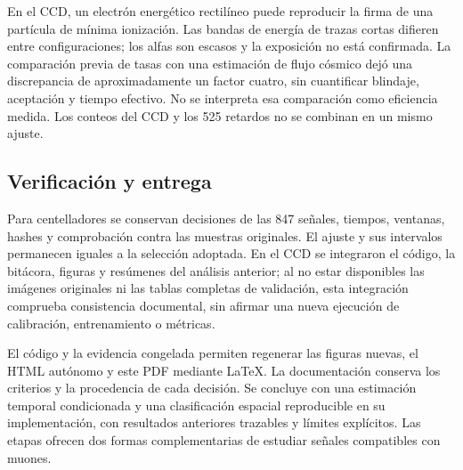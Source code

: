 \documentclass[10pt,a4paper]{article}
\begin{document}
En el CCD, un electrón energético rectilíneo puede reproducir la firma de una partícula de mínima ionización. Las bandas de energía de trazas cortas difieren entre configuraciones; los alfas son escasos y la exposición no está confirmada. La comparación previa de tasas con una estimación de flujo cósmico dejó una discrepancia de aproximadamente un factor cuatro, sin cuantificar blindaje, aceptación y tiempo efectivo. No se interpreta esa comparación como eficiencia medida. Los conteos del CCD y los 525 retardos no se combinan en un mismo ajuste.

\subsection*{Verificación y entrega}
Para centelladores se conservan decisiones de las 847 señales, tiempos, ventanas, hashes y comprobación contra las muestras originales. El ajuste y sus intervalos permanecen iguales a la selección adoptada. En el CCD se integraron el código, la bitácora, figuras y resúmenes del análisis anterior; al no estar disponibles las imágenes originales ni las tablas completas de validación, esta integración comprueba consistencia documental, sin afirmar una nueva ejecución de calibración, entrenamiento o métricas.

El código y la evidencia congelada permiten regenerar las figuras nuevas, el HTML autónomo y este PDF mediante LaTeX. La documentación conserva los criterios y la procedencia de cada decisión. Se concluye con una estimación temporal condicionada y una clasificación espacial reproducible en su implementación, con resultados anteriores trazables y límites explícitos. Las etapas ofrecen dos formas complementarias de estudiar señales compatibles con muones.
\end{document}
